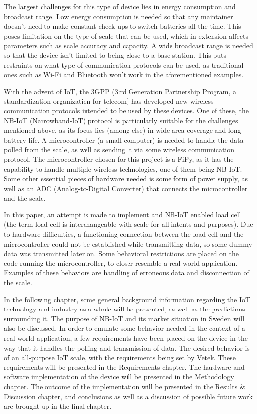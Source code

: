 The largest challenges for this type of device lies in energy consumption and broadcast range. Low energy consumption is needed so that any maintainer doesn't need to make constant check-ups to switch batteries all the time. This poses limitation on the type of scale that can be used, which in extension affects parameters such as scale accuracy and capacity. A wide broadcast range is needed so that the device isn't limited to being close to a base station. This puts restraints on what type of communication protocols can be used, as traditional ones such as Wi-Fi and Bluetooth won't work in the aforementioned examples.

With the advent of IoT, the 3GPP (3:rd Generation Partnership Program, a standardization organization for telecom) has developed new wireless communication protocols intended to be used by these devices. 
One of these, the NB-IoT (Narrowband-IoT) protocol is particularly suitable for the challenges mentioned above, as its focus lies (among else) in wide area coverage and long battery life. A microcontroller (a small computer) is needed to handle the data polled from the scale, as well as sending it via some wireless communication protocol. The microcontroller chosen for this project is a FiPy, as it has the capability to handle multiple wireless technologies, one of them being NB-IoT. Some other essential pieces of hardware needed is some form of power supply, as well as an ADC (Analog-to-Digital Converter) that connects the microcontroller and the scale.

In this paper, an attempt is made to implement and NB-IoT enabled load cell (the term load cell is interchangeable with scale for all intents and purposes). Due to hardware difficulties, a functioning connection between the load cell and the microcontroller could not be established while transmitting data, so some dummy data was transmitted later on. Some behavioral restrictions are placed on the code running the microcontroller, to closer resemble a real-world application. Examples of these behaviors are handling of erroneous data and disconnection of the scale.

In the following chapter, some general background information regarding the IoT technology and industry as a whole will be presented, as well as the predictions surrounding it. The purpose of NB-IoT and its market situation in Sweden will also be discussed. 
In order to emulate some behavior needed in the context of a real-world application, a few requirements have been placed on the device in the way that it handles the polling and transmission of data. The desired behavior is of an all-purpose IoT scale, with the requirements being set by Vetek.  These requirements will be presented in the Requirements chapter.
The hardware and software implementation of the device will be presented in the Methodology chapter.
The outcome of the implementation will be presented in the Results \& Discussion chapter, and
conclusions as well as a discussion of possible future work are brought up in the final chapter.

